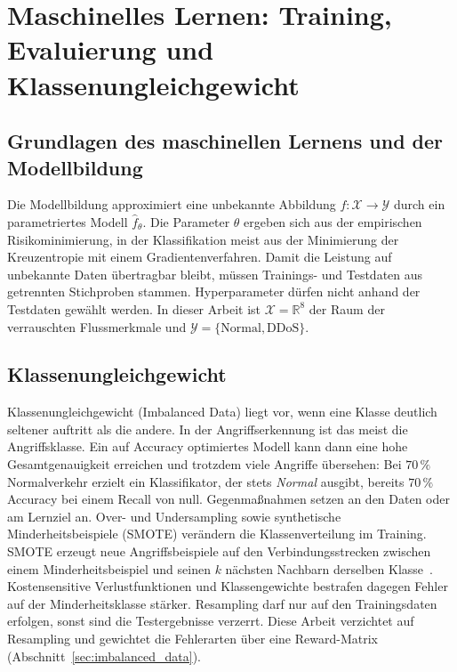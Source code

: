 \section{Maschinelles Lernen: Training, Evaluierung und Klassenungleichgewicht}
\label{sec:ml_evaluierung}

\subsection{Grundlagen des maschinellen Lernens und der Modellbildung}
Die Modellbildung approximiert eine unbekannte Abbildung $f:\mathcal{X}\to\mathcal{Y}$ durch ein parametriertes Modell $\hat{f}_\theta$. Die Parameter $\theta$ ergeben sich aus der empirischen Risikominimierung, in der Klassifikation meist aus der Minimierung der Kreuzentropie mit einem Gradientenverfahren. Damit die Leistung auf unbekannte Daten übertragbar bleibt, müssen Trainings- und Testdaten aus getrennten Stichproben stammen. Hyperparameter dürfen nicht anhand der Testdaten gewählt werden. In dieser Arbeit ist $\mathcal{X}=\mathbb{R}^8$ der Raum der verrauschten Flussmerkmale und $\mathcal{Y}=\{\text{Normal},\text{DDoS}\}$.

\subsection{Klassenungleichgewicht}
\label{sec:imbalanced_grundlagen}
Klassenungleichgewicht (Imbalanced Data) liegt vor, wenn eine Klasse deutlich seltener auftritt als die andere. In der Angriffserkennung ist das meist die Angriffsklasse. Ein auf Accuracy optimiertes Modell kann dann eine hohe Gesamtgenauigkeit erreichen und trotzdem viele Angriffe übersehen: Bei $70\,\%$ Normalverkehr erzielt ein Klassifikator, der stets \emph{Normal} ausgibt, bereits $70\,\%$ Accuracy bei einem Recall von null. Gegenmaßnahmen setzen an den Daten oder am Lernziel an. Over- und Undersampling sowie synthetische Minderheitsbeispiele (SMOTE) verändern die Klassenverteilung im Training. SMOTE erzeugt neue Angriffsbeispiele auf den Verbindungsstrecken zwischen einem Minderheitsbeispiel und seinen $k$ nächsten Nachbarn derselben Klasse~\autocite{chawlaSMOTESyntheticMinority2002}. Kostensensitive Verlustfunktionen und Klassengewichte bestrafen dagegen Fehler auf der Minderheitsklasse stärker. Resampling darf nur auf den Trainingsdaten erfolgen, sonst sind die Testergebnisse verzerrt. Diese Arbeit verzichtet auf Resampling und gewichtet die Fehlerarten über eine Reward-Matrix (Abschnitt~\ref{sec:imbalanced_data}).

